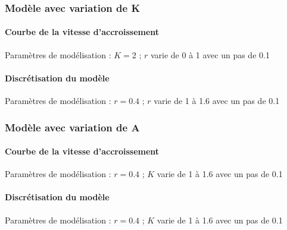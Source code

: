 \documentclass{article}
\begin{document}
\subsubsection{Modèle avec variation de K}

\paragraph{Courbe de la vitesse d'accroissement}
\begin{center}
\end{center}
Paramètres de modélisation : $K=2$  ; $r$ varie de 0 à 1 avec un pas de 0.1
\paragraph{}

\paragraph{Discrétisation du modèle}
\begin{center}
\end{center}
Paramètres de modélisation : $r=0.4$  ; $r$ varie de 1 à 1.6 avec un pas de 0.1
\paragraph{}

\subsubsection{Modèle avec variation de A}

\paragraph{Courbe de la vitesse d'accroissement}
\begin{center}
\end{center}
Paramètres de modélisation : $r=0.4$  ; $K$ varie de 1 à 1.6 avec un pas de 0.1
\paragraph{}

\paragraph{Discrétisation du modèle}
\begin{center}
\end{center}
Paramètres de modélisation : $r=0.4$  ; $K$ varie de 1 à 1.6 avec un pas de 0.1
\end{document}
